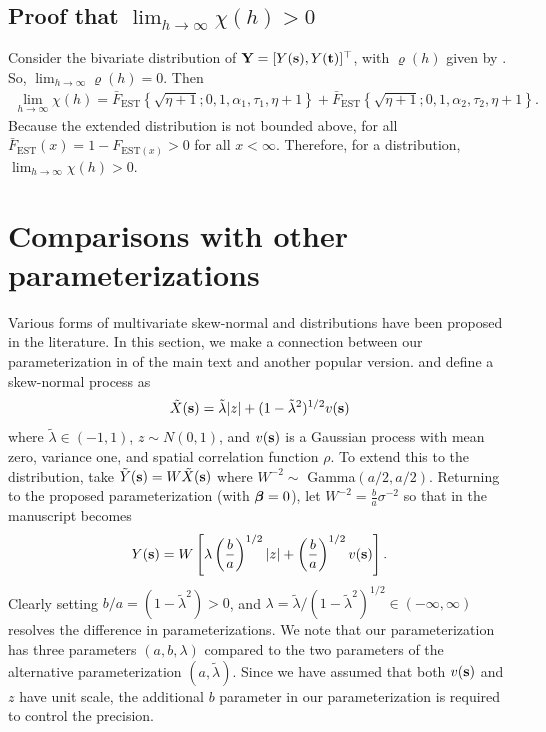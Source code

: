 \documentclass[useAMS,usenatbib,referee]{biomweb}
\begin{document}
\subsection*{Proof that $\lim_{h \rightarrow \infty} \chi(h) > 0$}
Consider the bivariate distribution of $\mbox{\bf Y} = [Y(\mbox{\bf s}), Y(\mbox{\bf t})]^\top$, with $\varrho(h)$ given by .
So, $\lim_{h \rightarrow \infty} \varrho(h) = 0$.
Then
\begin{align}
  \lim_{h \rightarrow \infty} \chi(h) = \bar{F}_{\text{EST}}\left\{ \sqrt{\eta + 1}; 0, 1, \alpha_1, \tau_1, \eta + 1 \right\} + \bar{F}_{\text{EST}}\left\{ \sqrt{\eta + 1}; 0, 1, \alpha_2, \tau_2, \eta + 1 \right\}.
\end{align}
Because the extended \skewt distribution is not bounded above, for all $\bar{F}_{\text{EST}}(x) = 1 - F_{\text{EST} (x)} > 0$ for all $x < \infty$.
Therefore, for a \skewt distribution, $\lim_{h \rightarrow \infty} \chi(h) > 0$.

\section{Comparisons with other parameterizations} \label{sta:otherparams}
Various forms of multivariate skew-normal and \skewt distributions have been proposed in the literature.
In this section, we make a connection between our parameterization in  of the main text and another popular version.
\citet{Azzalini2014} and \citet{Beranger2016} define a skew-normal process as
\begin{align}
  \tilde{X}(\mbox{\bf s}) = \tilde{\lambda}|z| + (1 - \tilde{\lambda}^2)^{1 / 2} v(\mbox{\bf s})
\end{align}
where $\tilde{\lambda} \in (-1, 1)$, $z \sim N(0, 1)$, and $v(\mbox{\bf s})$ is a Gaussian process with mean zero, variance one, and spatial correlation function $\rho$.
To extend this to the \skewt distribution, \citet{Azzalini2003} take $\tilde{Y}(\mbox{\bf s}) = W\tilde{X}(\mbox{\bf s})$ where $W^{-2} \sim $ Gamma$(a / 2, a / 2)$.
Returning to the proposed parameterization (with $\mbox{\boldmath $\beta$} = 0$), let $W^{-2} = \frac{b}{a}\sigma^{-2}$ so that  in the manuscript becomes
\begin{align}
  Y(\mbox{\bf s}) = W \left[ \lambda \left(\frac{b}{a}\right)^{1 / 2} |z| + \left(\frac{b}{a}\right)^{1 / 2} v(\mbox{\bf s}) \right].
\end{align}
Clearly setting $b / a = (1 - \tilde{\lambda}^2) > 0$, and $\lambda = \tilde{\lambda} / (1 - \tilde{\lambda}^2)^{1 / 2} \in (-\infty, \infty)$ resolves the difference in parameterizations.
We note that our parameterization has three parameters $(a, b, \lambda)$ compared to the two parameters of the alternative parameterization $(a, \tilde{\lambda})$.
Since we have assumed that both $v(\mbox{\bf s})$ and $z$ have unit scale, the additional $b$ parameter in our parameterization is required to control the precision.
\end{document}
